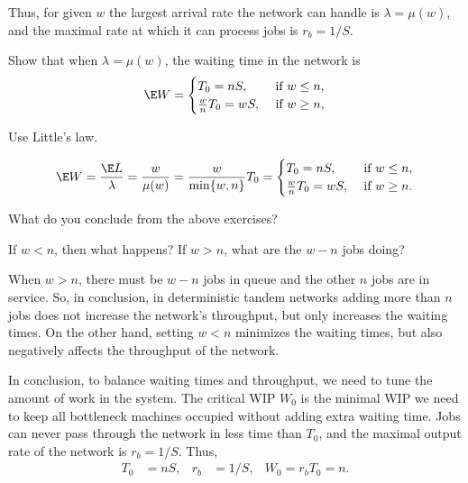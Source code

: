 Thus, for given $w$  the largest arrival rate the network  can handle is  $\lambda = \mu(w)$, and the maximal rate at which it can process jobs is $r_b=1/S$. 

\begin{exercise}
  Show that when $\lambda=\mu(w)$,  the waiting time in the network is 
\begin{equation*}
  \E W = 
\begin{cases}
  T_0=n S, & \text{ if } w\leq n, \\
  \frac{w}{n} T_0 = w S, & \text{ if } w\geq n,
\end{cases}
\end{equation*}
\begin{hint}
  Use Little's law.
\end{hint}
  \begin{solution}
\begin{equation*}
  \begin{split}
  \E W 
= \frac{\E L}{\lambda} = \frac{w}{\mu(w)} = \frac{w}{\min\{w, n\}} T_0 
=
\begin{cases}
  T_0=n S, & \text{ if } w\leq n, \\
  \frac{w}{n} T_0 = w S, & \text{ if } w\geq n.
\end{cases}
  \end{split}
\end{equation*}
  \end{solution}
\end{exercise}

\begin{exercise}
  What do you conclude from the above exercises?
  \begin{hint}
   If $w<n$, then what happens? If $w>n$, what are the $w-n$ jobs doing?
  \end{hint}
  \begin{solution}
When $w>n$, there must be $w-n$ jobs in queue and the
other $n$ jobs are in service. So, in conclusion, in deterministic
tandem networks adding more than $n$ jobs does not increase the
network's throughput, but only increases the waiting times. On the other
hand, setting $w<n$ minimizes the waiting times, but also negatively
affects the throughput of the network. 
  \end{solution}
\end{exercise}

In conclusion, to balance waiting times and throughput, we need to tune the amount of work in the system. The critical WIP $W_0$ is the minimal WIP we need to keep all bottleneck machines occupied without adding extra waiting time. Jobs can never pass through  the network in less time than $T_0$, and the maximal output rate of the network is $r_b = 1/S$. Thus, 
\begin{align}\label{eq:t0}
T_0&= n S, & r_b&= 1/S, & W_0 = r_b T_0 = n.
\end{align}

